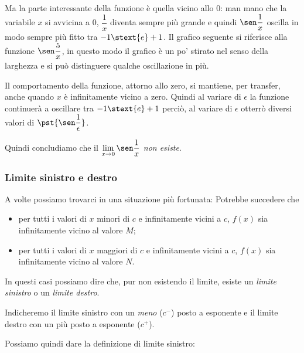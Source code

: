Ma la parte interessante della funzione è quella vicino allo \(0\):
man mano che la variabile \(x\) si avvicina a \(0\), \(\dfrac{1}{x}\) diventa 
sempre più grande e quindi \(\sen \dfrac{1}{x}\) oscilla in modo sempre più 
fitto tra \(-1 \stext{e} +1\).
Il grafico seguente si riferisce alla funzione \(\sen \dfrac{5}{x}\), in 
questo modo il grafico è un po' stirato nel senso della larghezza e si può 
distinguere qualche oscillazione in più.
\begin{center} \limitesinunosux \end{center}
Il comportamento della funzione, attorno allo zero, si mantiene, per 
transfer, anche quando \(x\) è infinitamente vicino a zero.
Quindi al variare di \(\epsilon\) la funzione continuerà a oscillare tra 
\(-1 \stext{e} +1\) perciò, al variare di \(\epsilon\) otterrò diversi valori 
di \(\pst{\sen \dfrac{1}{\epsilon}}\).

Quindi concludiamo che il 
\(\displaystyle \lim_{x \to 0}\sen \dfrac{1}{x}\) \emph{non esiste}.

\subsubsection{Limite sinistro e destro}
A volte possiamo trovarci in una situazione più fortunata:
Potrebbe succedere che 
\begin{itemize} [nosep]
\item 
per tutti i valori di \(x\) minori di \(c\) e infinitamente vicini a \(c\), 
\(f(x)\) sia infinitamente vicino al valore \(M\);
\item 
per tutti i valori di \(x\) maggiori di \(c\) e infinitamente vicini a \(c\), 
\(f(x)\) sia infinitamente vicino al valore \(N\). 
\end{itemize}

In questi casi possiamo dire che, pur non esistendo il limite, esiste un 
\emph{limite sinistro} o un \emph{limite destro}.

Indicheremo il limite sinistro con un \emph{meno} (\(c^-\)) posto a esponente 
e il limite destro con un più posto a esponente (\(c^+\)).

Possiamo quindi dare la definizione di limite sinistro:

